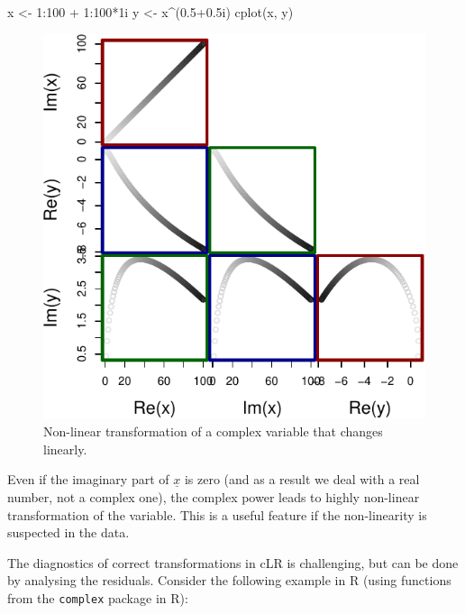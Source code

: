 \documentclass[
]{book}
\newenvironment{Shaded}{\begin{snugshade}}{\end{snugshade}}
\newcommand{\DecValTok}[1]{\textcolor[rgb]{0.00,0.00,0.81}{#1}}
\newcommand{\FloatTok}[1]{\textcolor[rgb]{0.00,0.00,0.81}{#1}}
\newcommand{\FunctionTok}[1]{\textcolor[rgb]{0.00,0.00,0.00}{#1}}
\newcommand{\NormalTok}[1]{#1}
\newcommand{\OtherTok}[1]{\textcolor[rgb]{0.56,0.35,0.01}{#1}}
\newcommand{\SpecialCharTok}[1]{\textcolor[rgb]{0.00,0.00,0.00}{#1}}
\begin{document}
\begin{Shaded}
\begin{Highlighting}[]
\NormalTok{x }\OtherTok{\textless{}{-}} \DecValTok{1}\SpecialCharTok{:}\DecValTok{100} \SpecialCharTok{+} \DecValTok{1}\SpecialCharTok{:}\DecValTok{100}\SpecialCharTok{*}\NormalTok{1i}
\NormalTok{y }\OtherTok{\textless{}{-}}\NormalTok{ x}\SpecialCharTok{\^{}}\NormalTok{(}\FloatTok{0.5+0.5}\NormalTok{i)}
\FunctionTok{cplot}\NormalTok{(x, y)}
\end{Highlighting}
\end{Shaded}

\begin{figure}
\centering
\includegraphics{Svetunkov---Svetunkov---Complex-Valued-Econometrics_files/figure-latex/unnamed-chunk-33-1.pdf}
\caption{\label{fig:unnamed-chunk-33}Non-linear transformation of a complex variable that changes linearly.}
\end{figure}

Even if the imaginary part of \(\underline{x}\) is zero (and as a result we deal with a real number, not a complex one), the complex power leads to highly non-linear transformation of the variable. This is a useful feature if the non-linearity is suspected in the data.

The diagnostics of correct transformations in cLR is challenging, but can be done by analysing the residuals. Consider the following example in R (using functions from the \texttt{complex} package in R):
\end{document}
